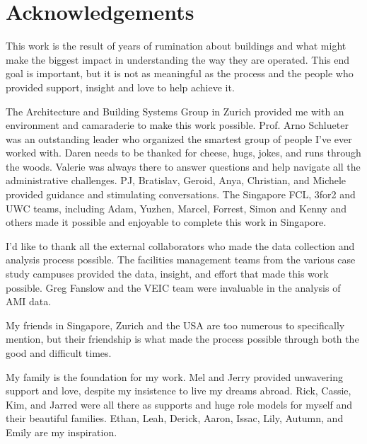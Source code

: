 \chapter{Acknowledgements}

This work is the result of years of rumination about buildings and what might make the biggest impact in understanding the way they are operated. This end goal is important, but it is not as meaningful as the process and the people who provided support, insight and love to help achieve it. 

The Architecture and Building Systems Group in Zurich provided me with an environment and camaraderie to make this work possible. Prof. Arno Schlueter was an outstanding leader who organized the smartest group of people I've ever worked with. Daren needs to be thanked for cheese, hugs, jokes, and runs through the woods. Valerie was always there to answer questions and help navigate all the administrative challenges. PJ, Bratislav, Geroid, Anya, Christian, and Michele provided guidance and stimulating conversations. The Singapore FCL, 3for2 and UWC teams, including Adam, Yuzhen, Marcel, Forrest, Simon and Kenny and others made it possible and enjoyable to complete this work in Singapore. 

I'd like to thank all the external collaborators who made the data collection and analysis process possible. The facilities management teams from the various case study campuses provided the data, insight, and effort that made this work possible. Greg Fanslow and the VEIC team were invaluable in the analysis of AMI data.

My friends in Singapore, Zurich and the USA are too numerous to specifically mention, but their friendship is what made the process possible through both the good and difficult times. 

My family is the foundation for my work. Mel and Jerry provided unwavering support and love, despite my insistence to live my dreams abroad. Rick, Cassie, Kim, and Jarred were all there as supports and huge role models for myself and their beautiful families. Ethan, Leah, Derick, Aaron, Issac, Lily, Autumn, and Emily are my inspiration. 
